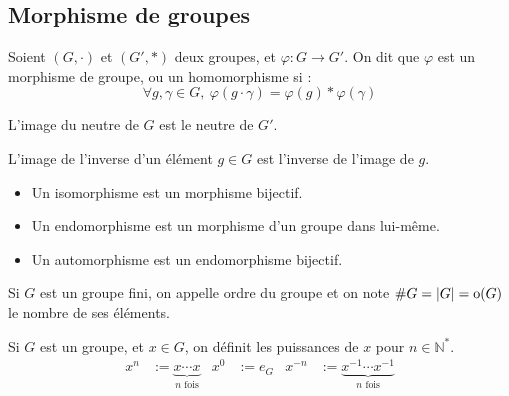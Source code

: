 \subsection{Morphisme de groupes}
\vspace{0.5em}

\begin{defi}

 Soient $(G,\cdotp)$ et $(G',*)$ deux groupes, et $\varphi : G \longrightarrow
G'$. On dit que $\varphi$ est un morphisme de groupe, ou un homomorphisme si :
\begin{displaymath} \forall g, \gamma \in G,\ \varphi(g\cdotp \gamma) =
\varphi(g) *
\varphi(\gamma)\end{displaymath}
\end{defi}

\begin{prop}
 
L'image du neutre de $G$ est le neutre de $G'$.

L'image de l'inverse d'un élément $g \in G$ est l'inverse de l'image de $g$.
\end{prop}

\begin{defi}
\begin{itemize}
 \item Un isomorphisme est un morphisme bijectif.
 \item Un endomorphisme est un morphisme d'un groupe dans lui-même.
 \item Un automorphisme est un endomorphisme bijectif.
\end{itemize}
\end{defi}

\begin{defi}
 
Si $G$ est un groupe fini, on appelle ordre du groupe et on note $\#G = |G| =
\textnormal{o}(G)$ le nombre de ses éléments.
\end{defi}

\pagebreak

\begin{defi}[Puissances]

 Si $G$ est un groupe, et $x\in G$, on définit les puissances de $x$ pour $n
\in \mathbb{N}^*$.
\begin{align*}
x^n &:=  \underbrace{x \cdots x}_{n\text{ fois}} &
x^0 &:=  e_G &
x^{-n} &:=  \underbrace{x^{-1} \cdots x^{-1}}_{n\text{ fois}}
\end{align*}
\end{defi}

